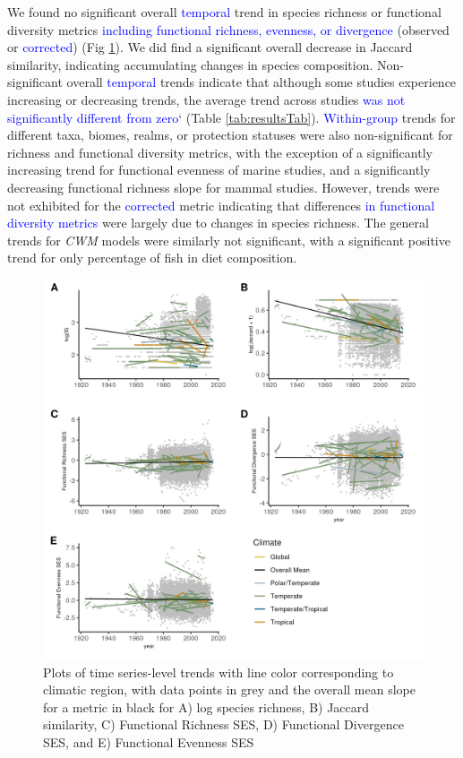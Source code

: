 \documentclass{article}
\begin{document}
We found no significant overall \textcolor{blue}{temporal} trend in
species richness or functional diversity metrics
\textcolor{blue}{including functional richness, evenness, or divergence}
(observed or \textcolor{blue}{corrected}) (Fig
\ref{fig:timeseriesPlot}). We did find a significant overall decrease in
Jaccard similarity, indicating accumulating changes in species
composition. Non-significant overall \textcolor{blue}{temporal} trends
indicate that although some studies experience increasing or decreasing
trends, the average trend across studies
\textcolor{blue}{was not significantly different from zero}` (Table
\ref{tab:resultsTab}). \textcolor{blue}{Within-group} trends for
different taxa, biomes, realms, or protection statuses were also
non-significant for richness and functional diversity metrics, with the
exception of a significantly increasing trend for functional evenness of
marine studies, and a significantly decreasing functional richness slope
for mammal studies. However, trends were not exhibited for the
\textcolor{blue}{corrected} metric indicating that differences
\textcolor{blue}{in functional diversity metrics} were largely due to
changes in species richness. The general trends for \emph{CWM} models
were similarly not significant, with a significant positive trend for
only percentage of fish in diet composition.

\begin{figure}
\includegraphics[width=\textwidth]{../../figures/3met_long} \caption{Plots of time series-level trends with line color corresponding to climatic region, with data points in grey and the overall mean slope for a metric in black for A) log species richness, B) Jaccard similarity, C) Functional Richness SES, D) Functional Divergence SES, and E) Functional Evenness SES}\label{fig:timeseriesPlot}
\end{figure}
\end{document}
